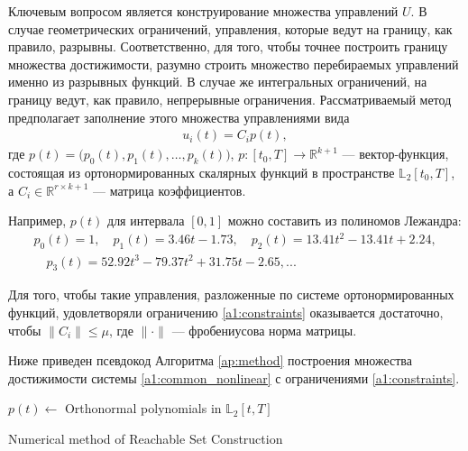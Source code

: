 \documentclass[../main.tex]{subfiles}
\begin{document}
  Ключевым вопросом является конструирование множества управлений $U$.
  В случае геометрических ограничений, управления, которые ведут на границу, как правило, разрывны.
  Соответственно, для того, чтобы точнее построить границу множества достижимости, разумно строить множество перебираемых управлений именно из разрывных функций. 
  В случае же интегральных ограничений, на границу ведут, как правило, непрерывные ограничения. 
  Рассматриваемый метод предполагает заполнение этого множества управлениями вида 
  \begin{gather}
  	u_i(t) = C_i p (t),
  \end{gather}
  где $p(t) = \big(p_{0}(t),p_{1}(t),\dots,p_{k}(t)\big)$, $p: [t_0, {T}] \rightarrow \mathbb{R}^{k+1} $ --- вектор-функция, состоящая из ортонормированных скалярных функций в пространстве $\mathbb{L}_2[t_0, {T}]$, а $C_i \in \mathbb{R}^{r \times k+1}$ --- матрица коэффициентов. 
  
  Например, $p(t)$ для интервала $[0,1]$ можно составить из полиномов Лежандра:
  \begin{gather*}
  	p_0(t) = 1, \quad p_1(t) = 3.46t-1.73, \quad p_2(t) = 13.41t^2 - 13.41t + 2.24, \\ \quad 
  	p_3(t) = 52.92t^3 - 79.37t^2+31.75t -2.65, ...
  \end{gather*}
  
  Для того, чтобы такие управления, разложенные по системе ортонормированных функций, удовлетворяли ограничению \eqref{a1:constraints} оказывается достаточно, чтобы $\|C_i\| \leqslant \mu$, где $\|\cdot\| $ --- фробениусова норма матрицы.
  
  Ниже приведен псевдокод Алгоритма \ref{ap:method} построения множества достижимости системы \eqref{a1:common_nonlinear} с ограничениями \eqref{a1:constraints}.
  \begin{algorithm}[hbt!]
  	$p(t) \gets $ Orthonormal polynomials in $\mathbb{L}_2[t,T]$ \;
  	\caption{Numerical method of Reachable Set Construction}
  	 \label{ap:method}
  \end{algorithm}
  
\end{document}
